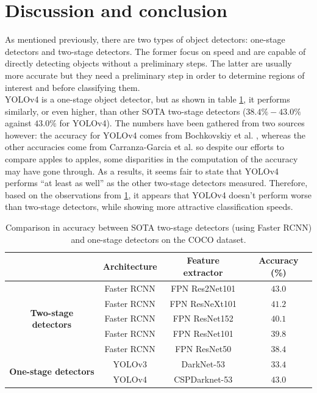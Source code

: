 \documentclass[runningheads]{llncs}
\begin{document}
\section{Discussion and conclusion}
As mentioned previously, there are two types of object detectors: one-stage detectors and two-stage detectors. The former focus on speed and are capable of directly detecting objects without a preliminary steps. The latter are usually more accurate but they need a preliminary step in order to determine regions of interest and before classifying them. \\
YOLOv4 is a one-stage object detector, but as shown in table \ref{table: comparison in accuracy between one- and two-stage SOTA detectors}, it performs similarly, or even higher, than other SOTA two-stage detectors ($38.4\% - 43.0\%$ against $43.0\%$ for YOLOv4). The numbers have been gathered from two sources however: the accuracy for YOLOv4 comes from Bochkovskiy et al. \cite{bochkovskiy_yolov4_2020}, whereas the other accuracies come from Carranza-Garcia et al. \cite{carranza-garcia_performance_2020} so despite our efforts to compare apples to apples, some disparities in the computation of the accuracy may have gone through. As a results, it seems fair to state that YOLOv4 performs ``at least as well'' as the other two-stage detectors measured. Therefore, based on the observations from \ref{table: comparison in accuracy between one- and two-stage SOTA detectors}, it appears that YOLOv4 doesn't perform worse than two-stage detectors, while showing more attractive classification speeds. \\

\begin{table}
    \centering
    \caption{Comparison in accuracy between SOTA two-stage detectors (using Faster RCNN) and one-stage detectors on the COCO dataset.}
    \begin{tabular}{c|c|c|c}
         & \textbf{Architecture} & \textbf{Feature extractor} & \textbf{Accuracy (\%)} \\
        \hline
        \multirow{5}{*}{\textbf{Two-stage detectors}}
         & Faster RCNN           & FPN Res2Net101             & $43.0$                 \\
         & Faster RCNN           & FPN ResNeXt101             & $41.2$                 \\
         & Faster RCNN           & FPN ResNet152              & $40.1$                 \\
         & Faster RCNN           & FPN ResNet101              & $39.8$                 \\
         & Faster RCNN           & FPN ResNet50               & $38.4$                 \\
        \hline
        \multirow{2}{*}{\textbf{One-stage detectors}}
         & YOLOv3                & DarkNet-53                 & $33.4$                 \\
         & YOLOv4                & CSPDarknet-53              & $43.0$
    \end{tabular}
    \label{table: comparison in accuracy between one- and two-stage SOTA detectors}
\end{table}
\end{document}
